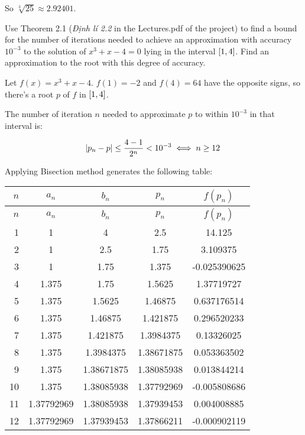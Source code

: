 \documentclass[../../../../Assignments.tex]{subfiles}
\begin{document}
\begin{solution}
    So \(\sqrt[3]{25} \approx \num{2.92401}\).
\end{solution}

\begin{exercise}
    Use Theorem 2.1 (\emph{Định lí 2.2} in the Lectures.pdf of the project) to
    find a bound for the number of iterations needed to achieve an approximation
    with accuracy \(10^{-3}\) to the solution of \(x^3 + x - 4 = 0\) lying in
    the interval \(\interval{1}{4}\). Find an approximation to the root with
    this degree of accuracy.
\end{exercise}

\begin{solution}
    Let \(f(x) = x^3 + x - 4\). \(f(1) = -2\) and \(f(4) = 64\) have the
    opposite signs, so there's a root \(p\) of \(f\) in \(\interval{1}{4}\).

    The number of iteration \(n\) needed to approximate \(p\) to within
    \(10^{-3}\) in that interval is:

    \[\abs{p_n - p} \leq \frac{4 - 1}{2^n} < 10^{-3} \iff n \geq 12\]

    Applying Bisection method generates the following table:

    \begin{longtable}{r S[table-format=1.8] S[table-format=1.8] S[table-format=1.8] S[table-format=-1.9]}
        \toprule
        \(n\)  &   {\(a_n\)}   &   {\(b_n\)}   &   {\(p_n\)}   &  {\(f(p_n)\)}  \\
        \midrule
        \endfirsthead
        \(n\)  &   {\(a_n\)}   &   {\(b_n\)}   &   {\(p_n\)}   &  {\(f(p_n)\)}  \\
        \midrule
          &  1            &  4            &  2.5          &  14.125        \\
            2  &  1            &  2.5          &  1.75         &   3.109375     \\
            3  &  1            &  1.75         &  1.375        &  -0.025390625  \\
            4  &  1.375        &  1.75         &  1.5625       &   1.37719727   \\
            5  &  1.375        &  1.5625       &  1.46875      &   0.637176514  \\
            6  &  1.375        &  1.46875      &  1.421875     &   0.296520233  \\
            7  &  1.375        &  1.421875     &  1.3984375    &   0.13326025   \\
            8  &  1.375        &  1.3984375    &  1.38671875   &   0.053363502  \\
            9  &  1.375        &  1.38671875   &  1.38085938   &   0.013844214  \\
           10  &  1.375        &  1.38085938   &  1.37792969   &  -0.005808686  \\
           11  &  1.37792969   &  1.38085938   &  1.37939453   &   0.004008885  \\
           12  &  1.37792969   &  1.37939453   &  1.37866211   &  -0.000902119  \\
        \bottomrule
    \end{longtable}


\end{solution}
\end{document}
